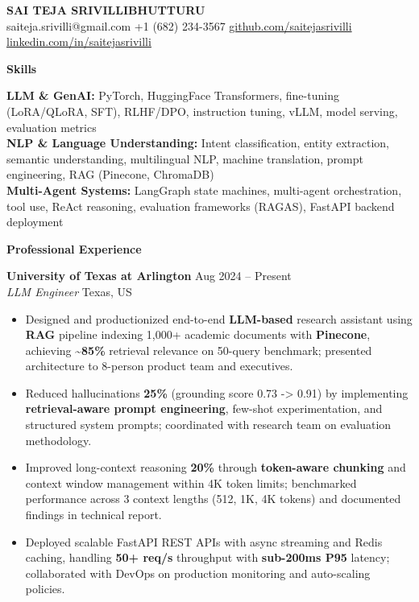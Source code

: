 \documentclass[10pt, letterpaper]{article}
\newcommand{\mysection}[1]{%
  \vspace{10pt}%
  {\noindent\large\bfseries #1}%
  \vspace{4pt}{\hrule}%
  \vspace{6pt}%
}
\newcommand{\resumeItem}[1]{\item\small{#1}}
\begin{document}
\begin{center}
  {\LARGE\textbf{SAI TEJA SRIVILLIBHUTTURU}} \\[2pt]
  \small
  saiteja.srivilli@gmail.com \quad +1 (682) 234-3567 \quad
  \href{https://github.com/saitejasrivilli}{github.com/saitejasrivilli} \quad
  \href{https://linkedin.com/in/saitejasrivilli}{linkedin.com/in/saitejasrivilli}
\end{center}
\vspace{-3mm}

\mysection{Skills}
\small
\noindent\textbf{LLM \& GenAI:} PyTorch, HuggingFace Transformers, fine-tuning (LoRA/QLoRA, SFT), RLHF/DPO, instruction tuning, vLLM, model serving, evaluation metrics \\
\noindent\textbf{NLP \& Language Understanding:} Intent classification, entity extraction, semantic understanding, multilingual NLP, machine translation, prompt engineering, RAG (Pinecone, ChromaDB) \\
\noindent\textbf{Multi-Agent Systems:} LangGraph state machines, multi-agent orchestration, tool use, ReAct reasoning, evaluation frameworks (RAGAS), FastAPI backend deployment

\vspace{-3mm}
\mysection{Professional Experience}

\noindent\textbf{University of Texas at Arlington} \hfill Aug 2024 -- Present \\
\textit{LLM Engineer} \hfill Texas, US
\begin{itemize}
  \resumeItem{Designed and productionized end-to-end \textbf{LLM-based} research assistant using \textbf{RAG} pipeline indexing 1,000+ academic documents with \textbf{Pinecone}, achieving \textbf{\textasciitilde 85\%} retrieval relevance on 50-query benchmark; presented architecture to 8-person product team and executives.}
  \resumeItem{Reduced hallucinations \textbf{25\%} (grounding score 0.73 -> 0.91) by implementing \textbf{retrieval-aware prompt engineering}, few-shot experimentation, and structured system prompts; coordinated with research team on evaluation methodology.}
  \resumeItem{Improved long-context reasoning \textbf{20\%} through \textbf{token-aware chunking} and context window management within 4K token limits; benchmarked performance across 3 context lengths (512, 1K, 4K tokens) and documented findings in technical report.}
  \resumeItem{Deployed scalable FastAPI REST APIs with async streaming and Redis caching, handling \textbf{50+ req/s} throughput with \textbf{sub-200ms P95} latency; collaborated with DevOps on production monitoring and auto-scaling policies.}
\end{itemize}
\end{document}
